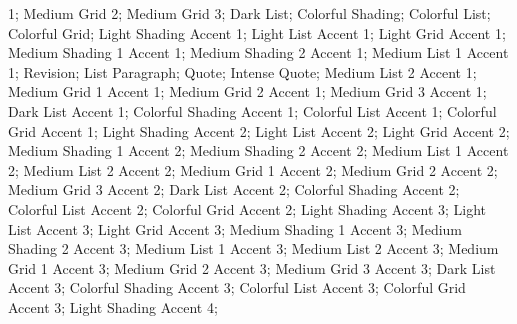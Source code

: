 1;  Medium Grid 2;  
Medium Grid 3;  Dark List;
 Colorful Shading;  Colorful
List;  Colorful Grid; 
Light Shading Accent 1;   Light List Accent
1;  Light Grid Accent 1;
 Medium Shading 1 Accent 1;  Medium
Shading 2 Accent 1;  Medium List 1 Accent 1;
  Revision; 
 List Paragraph;  
Quote;   Intense
Quote;  Medium List 2 Accent 1; 
 Medium Grid 1 Accent 1;  Medium
Grid 2 Accent 1;  Medium Grid 3 Accent
1;  Dark List Accent 1;
 Colorful Shading Accent 1;  
Colorful List Accent 1;  Colorful Grid Accent
1;  Light Shading Accent 2;
 Light List Accent 2;  Light Grid
Accent 2;   Medium Shading 1 Accent
2;  Medium Shading 2 Accent 2;
 Medium List 1 Accent 2;  Medium
List 2 Accent 2;   Medium Grid 1 Accent
2;  Medium Grid 2 Accent 2;
 Medium Grid 3 Accent 2;  Dark List
Accent 2;  Colorful Shading Accent 2;
  Colorful List Accent 2;
 Colorful Grid Accent 2;  Light
Shading Accent 3;  Light List Accent
3;  Light Grid Accent 3; 
 Medium Shading 1 Accent 3;  Medium
Shading 2 Accent 3;  Medium List 1 Accent
3;  Medium List 2 Accent 3; 
 Medium Grid 1 Accent 3;  Medium
Grid 2 Accent 3;  Medium Grid 3 Accent
3;  Dark List Accent 3;
 Colorful Shading Accent 3;  
Colorful List Accent 3;  Colorful Grid Accent
3;  Light Shading Accent 4;
